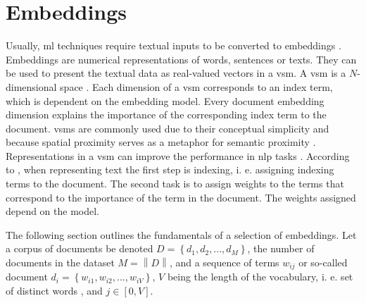 \section{Embeddings}\label{sec:embeddings}

Usually, \ac{ml} techniques require textual inputs to be converted to embeddings \cite{SentRep2014}.
Embeddings are numerical representations of words, sentences or texts.
They can be used to present the textual data as real-valued vectors in a \ac{vsm}.
A \ac{vsm} is a $N$-dimensional space \cite{soft_cosine2014}.
Each dimension of a \ac{vsm} corresponds to an index term, which is dependent on the embedding model.
Every document embedding dimension explains the importance of the corresponding index term to the document.
\acp{vsm} are commonly used due to their conceptual simplicity and because spatial proximity serves as a metaphor for semantic proximity 
\cite{tfidf2008, UniversalSentEnc2018, HfsentTrans2019, Top2Vec2020}.
Representations in a \ac{vsm} can improve the performance in \ac{nlp} tasks \cite{SkipGram2013}.
According to \citeauthor{tfidf2008}, when representing text the first step is indexing, i. e. assigning indexing terms to the document.
The second task is to assign weights to the terms that correspond to the importance of the term in the document.
The weights assigned depend on the model.

The following section outlines the fundamentals of a selection of embeddings.
Let a corpus of documents be denoted $D= \left\{d_1, d_2, ..., d_M  \right\}$, 
the number of documents in the dataset $M = \left\| D \right\|$,
and a sequence of terms $w_{ij}$ or so-called document $d_i = \left\{w_{i1}, w_{i2}, ..., w_{iV}  \right\}$, 
$V$ being the length of the vocabulary, 
i. e. set of distinct words \cite{clusteringDocs2020}, and $j \in [0, V]$.










